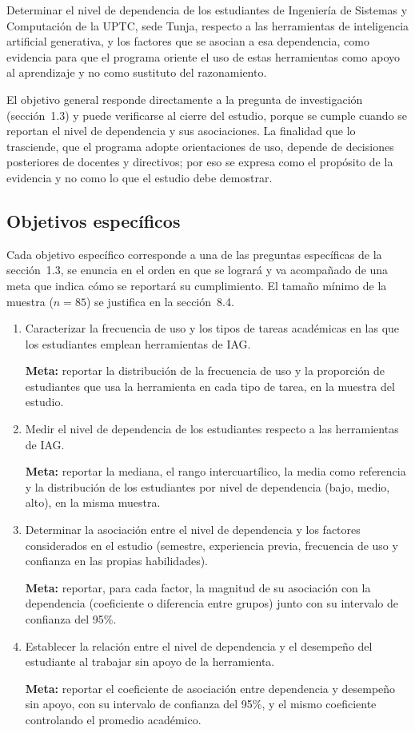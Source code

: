 \documentclass[12pt,letterpaper]{article}
\numberwithin{table}{section}
\numberwithin{figure}{section}
\begin{document}
Determinar el nivel de dependencia de los estudiantes de Ingeniería de Sistemas y Computación de la UPTC, sede Tunja, respecto a las herramientas de inteligencia artificial generativa, y los factores que se asocian a esa dependencia, como evidencia para que el programa oriente el uso de estas herramientas como apoyo al aprendizaje y no como sustituto del razonamiento.

El objetivo general responde directamente a la pregunta de investigación (sección~1.3) y puede verificarse al cierre del estudio, porque se cumple cuando se reportan el nivel de dependencia y sus asociaciones. La finalidad que lo trasciende, que el programa adopte orientaciones de uso, depende de decisiones posteriores de docentes y directivos; por eso se expresa como el propósito de la evidencia y no como lo que el estudio debe demostrar.

\subsection{Objetivos específicos}

Cada objetivo específico corresponde a una de las preguntas específicas de la sección~1.3, se enuncia en el orden en que se logrará y va acompañado de una meta que indica cómo se reportará su cumplimiento. El tamaño mínimo de la muestra ($n = 85$) se justifica en la sección~8.4.

\begin{enumerate}
  \item Caracterizar la frecuencia de uso y los tipos de tareas académicas en las que los estudiantes emplean herramientas de IAG.

  \textbf{Meta:} reportar la distribución de la frecuencia de uso y la proporción de estudiantes que usa la herramienta en cada tipo de tarea, en la muestra del estudio.

  \item Medir el nivel de dependencia de los estudiantes respecto a las herramientas de IAG.

  \textbf{Meta:} reportar la mediana, el rango intercuartílico, la media como referencia y la distribución de los estudiantes por nivel de dependencia (bajo, medio, alto), en la misma muestra.

  \item Determinar la asociación entre el nivel de dependencia y los factores considerados en el estudio (semestre, experiencia previa, frecuencia de uso y confianza en las propias habilidades).

  \textbf{Meta:} reportar, para cada factor, la magnitud de su asociación con la dependencia (coeficiente o diferencia entre grupos) junto con su intervalo de confianza del 95\%.

  \item Establecer la relación entre el nivel de dependencia y el desempeño del estudiante al trabajar sin apoyo de la herramienta.

  \textbf{Meta:} reportar el coeficiente de asociación entre dependencia y desempeño sin apoyo, con su intervalo de confianza del 95\%, y el mismo coeficiente controlando el promedio académico.
\end{enumerate}
\end{document}
